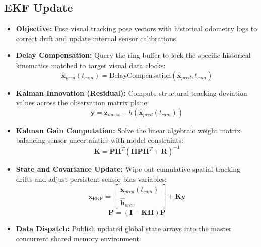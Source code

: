 \documentclass{article}
\begin{document}
\subsection{EKF Update}
\begin{itemize}
    \item \textbf{Objective:} Fuse visual tracking pose vectors with historical odometry logs to correct drift and update internal sensor calibrations.
    \item \textbf{Delay Compensation:} Query the ring buffer to lock the specific historical kinematics matched to target visual data clocks:
    $$\hat{\mathbf{x}}_{pred}(t_{cam}) = \text{DelayCompensation}(\hat{\mathbf{x}}_{pred}, t_{cam})$$
    \item \textbf{Kalman Innovation (Residual):} Compute structural tracking deviation values across the observation matrix plane:
    $$\mathbf{y} = \mathbf{z}_{meas} - h(\hat{\mathbf{x}}_{pred}(t_{cam}))$$
    \item \textbf{Kalman Gain Computation:} Solve the linear algebraic weight matrix balancing sensor uncertainties with model constraints:
    $$\mathbf{K} = \mathbf{P} \mathbf{H}^T (\mathbf{H} \mathbf{P} \mathbf{H}^T + \mathbf{R})^{-1}$$
    \item \textbf{State and Covariance Update:} Wipe out cumulative spatial tracking drifts and adjust persistent sensor bias variables:
    $$\mathbf{x}_{\text{EKF}} = \begin{bmatrix} \hat{\mathbf{x}}_{pred}(t_{cam}) \\ \hat{\mathbf{b}}_{prev} \end{bmatrix} + \mathbf{K} \mathbf{y}$$
    $$\mathbf{P} = (\mathbf{I} - \mathbf{K} \mathbf{H}) \mathbf{P}$$
    \item \textbf{Data Dispatch:} Publish updated global state arrays into the master concurrent shared memory environment.
\end{itemize}
\end{document}
